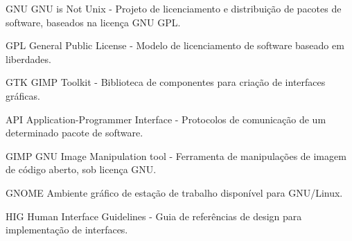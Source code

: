 \begin{siglas}
  \item[GNU] GNU is Not Unix - Projeto de licenciamento e distribuição de pacotes de software, baseados na licença GNU GPL.
  \item[GPL] General Public License - Modelo de licenciamento de software baseado em liberdades.
  \item[GTK] GIMP Toolkit - Biblioteca de componentes para criação de interfaces gráficas.
  \item[API] Application-Programmer Interface - Protocolos de comunicação de um determinado pacote de software.
  \item[GIMP] GNU Image Manipulation tool - Ferramenta de manipulações de imagem de código aberto, sob licença GNU.
  \item[GNOME] Ambiente gráfico de estação de trabalho disponível para GNU/Linux.
  \item[HIG] Human Interface Guidelines - Guia de referências de design para implementação de interfaces.
\end{siglas}

